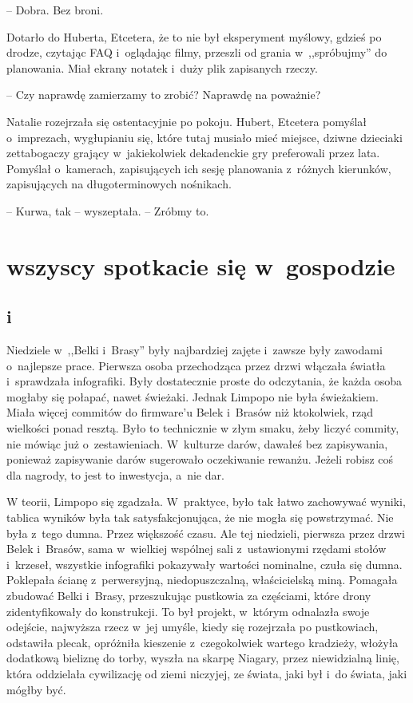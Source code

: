 \documentclass[oneside,polish,11pt,sfheadings]{mwbk}
\begin{document}
-- Dobra. Bez
broni.

Dotarło do Huberta, Etcetera, że to nie był eksperyment myślowy, gdzieś
po drodze, czytając FAQ i~oglądając filmy, przeszli od grania w~,,spróbujmy'' do planowania. Miał ekrany notatek i~duży plik zapisanych
rzeczy.

-- Czy naprawdę zamierzamy to zrobić? Naprawdę na poważnie?

Natalie rozejrzała się ostentacyjnie po pokoju. Hubert, Etcetera
pomyślał o~imprezach, wygłupianiu się, które tutaj musiało mieć miejsce,
dziwne dzieciaki zettabogaczy grający w~jakiekolwiek dekadenckie gry
preferowali przez lata. Pomyślał o~kamerach, zapisujących ich sesję
planowania z~różnych kierunków, zapisujących na długoterminowych
nośnikach.

-- Kurwa, tak -- wyszeptała. -- Zróbmy to.

\part{wszyscy spotkacie się w~gospodzie}

\chapter*{i}
Niedziele w~,,Belki i~Brasy'' były najbardziej zajęte i~zawsze były
zawodami o~najlepsze prace. Pierwsza osoba przechodząca przez drzwi
włączała światła i~sprawdzała infografiki. Były dostatecznie proste do
odczytania, że każda osoba mogłaby się połapać, nawet świeżaki. Jednak
Limpopo nie była świeżakiem. Miała więcej commitów do firmware'u Belek i~Brasów niż ktokolwiek, rząd wielkości ponad resztą. Było to technicznie
w złym smaku, żeby liczyć commity, nie mówiąc już o~zestawieniach. W~kulturze darów, dawałeś bez zapisywania, ponieważ zapisywanie darów
sugerowało oczekiwanie rewanżu. Jeżeli robisz coś dla nagrody, to jest
to inwestycja, a~nie dar.

W teorii, Limpopo się zgadzała. W~praktyce, było tak łatwo zachowywać
wyniki, tablica wyników była tak satysfakcjonująca, że nie mogła się
powstrzymać. Nie była z~tego dumna. Przez większość czasu. Ale tej
niedzieli, pierwsza przez drzwi Belek i~Brasów, sama w~wielkiej wspólnej
sali z~ustawionymi rzędami stołów i~krzeseł, wszystkie infografiki
pokazywały wartości nominalne, czuła się dumna. Poklepała ścianę z~perwersyjną, niedopuszczalną, właścicielską miną. Pomagała zbudować
Belki i~Brasy, przeszukując pustkowia za częściami, które drony
zidentyfikowały do konstrukcji. To był projekt, w~którym odnalazła swoje
odejście, najwyższa rzecz w~jej umyśle, kiedy się rozejrzała po
pustkowiach, odstawiła plecak, opróżniła kieszenie z~czegokolwiek
wartego kradzieży, włożyła dodatkową bieliznę do torby, wyszła na skarpę
Niagary, przez niewidzialną linię, która oddzielała cywilizację od ziemi
niczyjej, ze świata, jaki był i~do świata, jaki mógłby być.
\end{document}
